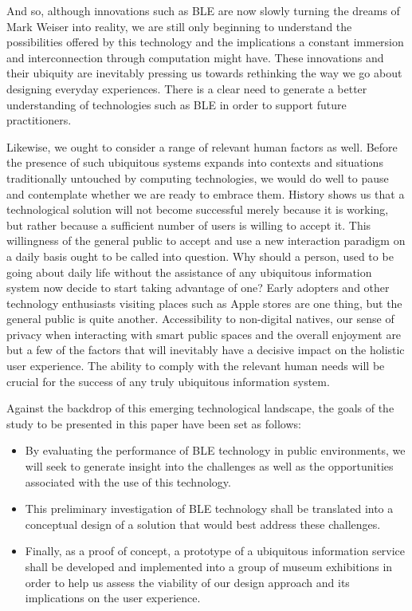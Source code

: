 \documentclass[prodmode,acmtomm]{acmsmall}
\begin{document}
And so, although innovations such as BLE are now slowly turning the dreams of Mark Weiser into reality, we are still only beginning to understand the possibilities offered by this technology and the implications a constant immersion and interconnection through computation might have. These innovations and their ubiquity are inevitably pressing us towards rethinking the way we go about designing everyday experiences. There is a clear need to generate a better understanding of technologies such as BLE in order to support future practitioners. 

Likewise, we ought to consider a range of relevant human factors as well. Before the presence of such ubiquitous systems expands into contexts and situations traditionally untouched by computing technologies, we would do well to pause and contemplate whether we are ready to embrace them. History shows us that a technological solution will not become successful merely because it is working, but rather because a sufficient number of users is willing to accept it. This willingness of the general public to accept and use a new interaction paradigm on a daily basis ought to be called into question. Why should a person, used to be going about daily life without the assistance of any ubiquitous information system now decide to start taking advantage of one? Early adopters and other technology enthusiasts visiting places such as Apple stores \cite{apple2013} are one thing, but the general public is quite another. Accessibility to non-digital natives, our sense of privacy when interacting with smart public spaces and the overall enjoyment are but a few of the factors that will inevitably have a decisive impact on the holistic user experience. The ability to comply with the relevant human needs will be crucial for the success of any truly ubiquitous information system. 

Against the backdrop of this emerging technological landscape, the goals of the study to be presented in this paper have been set as follows: 

\begin{itemize}
\item By evaluating the performance of BLE technology in public environments, we will seek to generate insight into the challenges as well as the opportunities associated with the use of this technology. 

\item This preliminary investigation of BLE technology shall be translated into a conceptual design of a solution that would best address these challenges. 

\item Finally, as a proof of concept, a prototype of a ubiquitous information service shall be developed and implemented into a group of museum exhibitions in order to help us assess the viability of our design approach and its implications on the user experience.
\end{itemize}
\end{document}
